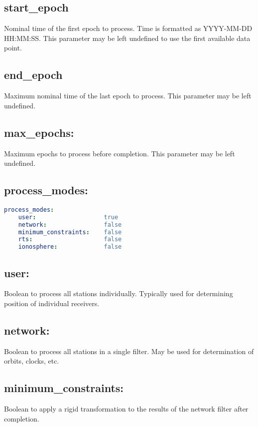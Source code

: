 \subsection*{start\_epoch}
Nominal time of the first epoch to process. Time is formatted as YYYY-MM-DD HH:MM:SS.
This parameter may be left undefined to use the first available data point.

\subsection*{end\_epoch}
Maximum nominal time of the last epoch to process. This parameter may be left undefined.

\subsection*{max\_epochs:}
Maximum epochs to process before completion. This parameter may be left undefined.

\subsection*{process\_modes:}

\begin{lstlisting}[language=yaml,caption=process\_modes:]
process_modes:
    user:                   true
    network:                false
    minimum_constraints:    false
    rts:                    false
    ionosphere:             false
\end{lstlisting}

\subsection*{user:}
Boolean to process all stations individually. Typically used for determining position of individual receivers.

\subsection*{network:}
Boolean to process all stations in a single filter. May be used for determination of orbits, clocks, etc.

\subsection*{minimum\_constraints:}
Boolean to apply a rigid transformation to the results of the network filter after completion.

